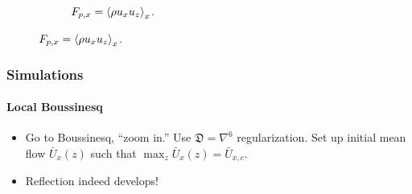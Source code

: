 \documentclass[dvipsnames, 10pt]{beamer}
\DeclarePairedDelimiter\ev{\langle}{\rangle}
\begin{document}
\begin{frame}
\begin{figure}[t]
\begin{subfigure}{0.53\textwidth}
            \caption{$F_{p, x} = \ev*{\rho u_x u_z}_x$.}
        \end{subfigure}
        \hspace*{-19mm}%
    \end{figure}
\end{frame}

\begin{frame}
    \frametitle{Simulations}
    \framesubtitle{Local Boussinesq}

    \begin{itemize}
        \item Go to Boussinesq, ``zoom in.'' Use $\mathfrak{D} = \nabla^6$
            regularization. Set up initial mean flow $\bar{U}_x(z)$ such that
            $\max_z \bar{U}_x(z) = \bar{U}_{x, c}$.

        \item Reflection indeed develops!
    \end{itemize}


\end{frame}
\end{document}
